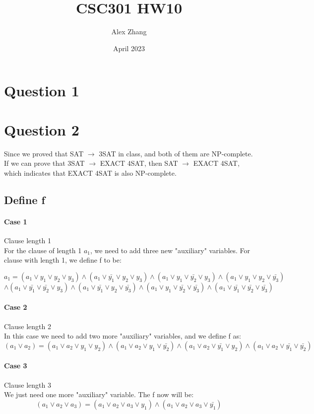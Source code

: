 \documentclass{article}
\title{CSC301 HW10}
\author{Alex Zhang}
\date{April 2023}
\begin{document}
\maketitle
\section*{Question 1}

\section*{Question 2}
Since we proved that SAT $\rightarrow$ 3SAT in class, and both of them are NP-complete.
If we can prove that 3SAT $\rightarrow$ EXACT 4SAT, then SAT $\rightarrow$ EXACT 4SAT, which indicates that EXACT 4SAT
is also NP-complete. 
\subsection*{Define f}
\paragraph*{Case 1} Clause length 1\\

For the clause of length 1 $a_1$, we need to add three new "auxiliary" variables. For clause with length 1, we define 
f to be:


$$a_1 = (a_1\vee y_1 \vee y_2 \vee y_3) \wedge (a_1\vee \bar{y_1} \vee y_2 \vee y_3) \wedge (a_1\vee y_1 \vee \bar{y_2} \vee y_3) \wedge (a_1\vee y_1 \vee y_2 \vee \bar{y_3})$$
$$\wedge (a_1\vee \bar{y_1} \vee \bar{y_2} \vee y_3) \wedge (a_1\vee \bar{y_1} \vee y_2 \vee \bar{y_3}) \wedge (a_1\vee y_1 \vee \bar{y_2} \vee \bar{y_3}) \wedge (a_1\vee \bar{y_1} \vee \bar{y_2} \vee \bar{y_3}) $$

\paragraph*{Case 2} Clause length 2\\
In this case we need to add two more "auxiliary" variables, and we define f as:
$$(a_1 \vee a_2) = (a_1 \vee a_2 \vee y_1 \vee y_2) \wedge (a_1 \vee a_2 \vee y_1 \vee \bar{y_2}) \wedge (a_1 \vee a_2 \vee \bar{y_1} \vee y_2) \wedge (a_1 \vee a_2 \vee \bar{y_1} \vee \bar{y_2})$$

\paragraph*{Case 3} Clause length 3\\
We just need one more "auxiliary" variable. The f now will be:
$$(a_1 \vee a_2 \vee a_3) = (a_1 \vee a_2 \vee a_3 \vee y_1) \wedge (a_1 \vee a_2 \vee a_3 \vee \bar{y_1})$$
\end{document}
